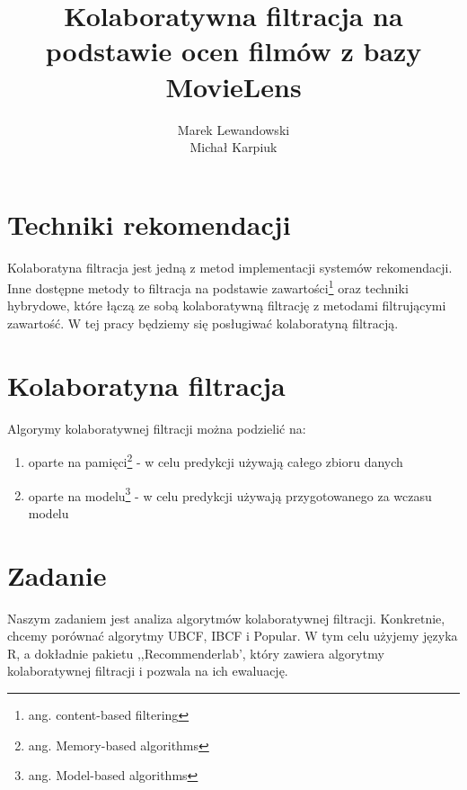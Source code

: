 \documentclass[12pt, a4paper]{article}
\title{\textbf{Kolaboratywna filtracja na podstawie ocen filmów z bazy MovieLens}}
\author{Marek Lewandowski \\ Michał Karpiuk}
\date{}
\begin{document}
\maketitle

\section{Techniki rekomendacji}
Kolaboratyna filtracja jest jedną z metod implementacji systemów rekomendacji. Inne 
dostępne metody to filtracja na podstawie zawartości\footnote{ang. content-based filtering} 
oraz techniki hybrydowe, które łączą ze sobą kolaboratywną filtrację z metodami 
filtrującymi zawartość. W tej pracy będziemy się posługiwać kolaboratyną filtracją.

\section{Kolaboratyna filtracja}
Algorymy kolaboratywnej filtracji można podzielić na:

\begin{enumerate} 
\item oparte na pamięci\footnote{ang. Memory-based algorithms} - w celu predykcji używają całego zbioru danych
\item oparte na modelu\footnote{ang. Model-based algorithms} - w celu predykcji używają 
przygotowanego za wczasu modelu
\end{enumerate}

\section{Zadanie}
Naszym zadaniem jest analiza algorytmów kolaboratywnej filtracji. Konkretnie, chcemy 
porównać algorytmy UBCF, IBCF i Popular. W tym celu użyjemy języka R, a 
dokładnie pakietu ,,Recommenderlab', który zawiera algorytmy kolaboratywnej filtracji i 
pozwala na ich ewaluację.


\end{document}

